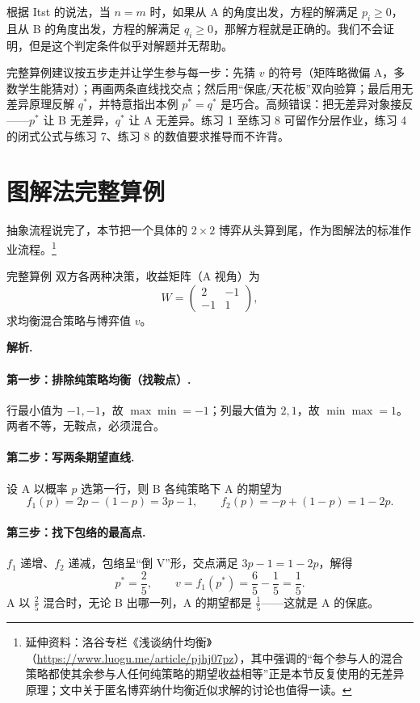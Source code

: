 \documentclass[UTF8,a4paper,11pt,oneside,openany,fontset=fandol]{ctexbook}
\theoremstyle{definition}
\newcommand{\sol}{\par\noindent\textbf{解析.}\ }
\begin{document}
根据 Itst 的说法，当 $n=m$ 时，如果从 A 的角度出发，方程的解满足 $p_i\ge0$，且从 B 的角度出发，方程的解满足 $q_i\ge0$，那解方程就是正确的。我们不会证明，但是这个判定条件似乎对解题并无帮助。

\begin{teach}[数值算例的课堂流程]
完整算例建议按五步走并让学生参与每一步：先猜 $v$ 的符号（矩阵略微偏 A，多数学生能猜对）；再画两条直线找交点；然后用“保底/天花板”双向验算；最后用无差异原理反解 $q^*$，并特意指出本例 $p^*=q^*$ 是巧合。高频错误：把无差异对象接反——$p^*$ 让 B 无差异，$q^*$ 让 A 无差异。练习 1 至练习 8 可留作分层作业，练习 4 的闭式公式与练习 7、练习 8 的数值要求推导而不许背。
\end{teach}
\section{图解法完整算例}
抽象流程说完了，本节把一个具体的 $2\times2$ 博弈从头算到尾，作为图解法的标准作业流程。\footnote{延伸资料：洛谷专栏《浅谈纳什均衡》（\url{https://www.luogu.me/article/pjhj07pz}），其中强调的“每个参与人的混合策略都使其余参与人任何纯策略的期望收益相等”正是本节反复使用的无差异原理；文中关于匿名博弈纳什均衡近似求解的讨论也值得一读。}

\begin{problem}{完整算例}
双方各两种决策，收益矩阵（A 视角）为
\[
 W=\begin{pmatrix}2&-1\\-1&1\end{pmatrix},
\]
求均衡混合策略与博弈值 $v$。
\end{problem}

\sol \paragraph{第一步：排除纯策略均衡（找鞍点）.} 行最小值为 $-1,-1$，故 $\max\min=-1$；列最大值为 $2,1$，故 $\min\max=1$。两者不等，无鞍点，必须混合。

\paragraph{第二步：写两条期望直线.} 设 A 以概率 $p$ 选第一行，则 B 各纯策略下 A 的期望为
\[
 f_1(p)=2p-(1-p)=3p-1,\qquad f_2(p)=-p+(1-p)=1-2p .
\]
\paragraph{第三步：找下包络的最高点.} $f_1$ 递增、$f_2$ 递减，包络呈“倒 V”形，交点满足 $3p-1=1-2p$，解得
\[
 p^{*}=\frac25,\qquad v=f_1(p^{*})=\frac65-\frac15=\frac15 .
\]
A 以 $\tfrac25$ 混合时，无论 B 出哪一列，A 的期望都是 $\tfrac15$——这就是 A 的保底。
\end{document}
